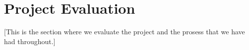 \section{Project Evaluation}\label{evaluation}
    [This is the section where we evaluate the project and the prosess that we have had throughout.]
